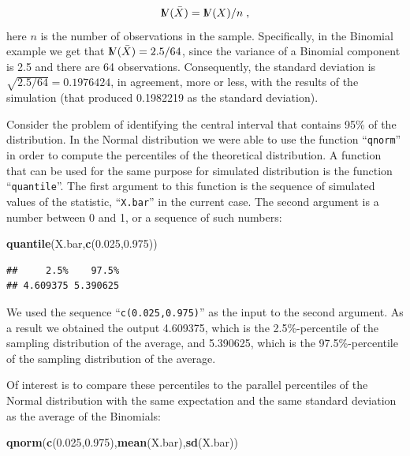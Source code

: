 \documentclass[]{krantz}
\makeatletter
\newenvironment{Shaded}{\begin{snugshade}}{\end{snugshade}}
\newcommand{\KeywordTok}[1]{\textcolor[rgb]{0.13,0.29,0.53}{\textbf{#1}}}
\newcommand{\FloatTok}[1]{\textcolor[rgb]{0.00,0.00,0.81}{#1}}
\newcommand{\NormalTok}[1]{#1}
\newcommand{\Var}{{\rm I\kern-.3em V}}
\newenvironment{kframe}{%
\medskip{}
\setlength{\fboxsep}{.8em}
 \def\at@end@of@kframe{}%
 \ifinner\ifhmode%
  \def\at@end@of@kframe{\end{minipage}}%
  \begin{minipage}{\columnwidth}%
 \fi\fi%
 \def\FrameCommand##1{\hskip\@totalleftmargin \hskip-\fboxsep
 \colorbox{shadecolor}{##1}\hskip-\fboxsep
     \hskip-\linewidth \hskip-\@totalleftmargin \hskip\columnwidth}%
 \MakeFramed {\advance\hsize-\width
   \@totalleftmargin\z@ \linewidth\hsize
   \@setminipage}}%
 {\par\unskip\endMakeFramed%
 \at@end@of@kframe}
\renewenvironment{Shaded}{\begin{kframe}}{\end{kframe}}
\theoremstyle{definition}
\theoremstyle{definition}
\theoremstyle{definition}
\theoremstyle{remark}
\makeatother
\begin{document}
\[\Var(\bar X) = \Var(X)/n\;,\] here \(n\) is the number of observations
in the sample. Specifically, in the Binomial example we get that
\(\Var(\bar X) = 2.5/64\), since the variance of a Binomial component is
2.5 and there are 64 observations. Consequently, the standard deviation
is \(\sqrt{2.5/64} = 0.1976424\), in agreement, more or less, with the
results of the simulation (that produced 0.1982219 as the standard
deviation).

Consider the problem of identifying the central interval that contains
95\% of the distribution. In the Normal distribution we were able to use
the function ``\texttt{qnorm}'' in order to compute the percentiles of
the theoretical distribution. A function that can be used for the same
purpose for simulated distribution is the function
``\texttt{quantile}''. The first argument to this function is the
sequence of simulated values of the statistic, ``\texttt{X.bar}'' in the
current case. The second argument is a number between 0 and 1, or a
sequence of such numbers:

\begin{Shaded}
\begin{Highlighting}[]
\KeywordTok{quantile}\NormalTok{(X.bar,}\KeywordTok{c}\NormalTok{(}\FloatTok{0.025}\NormalTok{,}\FloatTok{0.975}\NormalTok{))}
\end{Highlighting}
\end{Shaded}

\begin{verbatim}
##     2.5%    97.5% 
## 4.609375 5.390625
\end{verbatim}

We used the sequence ``\texttt{c(0.025,0.975)}'' as the input to the
second argument. As a result we obtained the output 4.609375, which is
the 2.5\%-percentile of the sampling distribution of the average, and
5.390625, which is the 97.5\%-percentile of the sampling distribution of
the average.

Of interest is to compare these percentiles to the parallel percentiles
of the Normal distribution with the same expectation and the same
standard deviation as the average of the Binomials:

\begin{Shaded}
\begin{Highlighting}[]
\KeywordTok{qnorm}\NormalTok{(}\KeywordTok{c}\NormalTok{(}\FloatTok{0.025}\NormalTok{,}\FloatTok{0.975}\NormalTok{),}\KeywordTok{mean}\NormalTok{(X.bar),}\KeywordTok{sd}\NormalTok{(X.bar))}
\end{Highlighting}
\end{Shaded}
\end{document}
